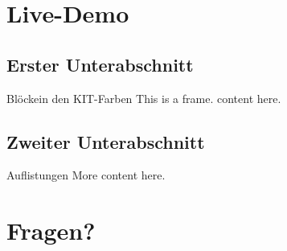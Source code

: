 \section{Live-Demo}

\subsection{Erster Unterabschnitt}
\begin{frame}{Blöcke}{in den KIT-Farben}
    This is a frame. content here.
\end{frame}

\subsection{Zweiter Unterabschnitt}
\begin{frame}{Auflistungen}
    More content here.
\end{frame}

\section{Fragen?}
